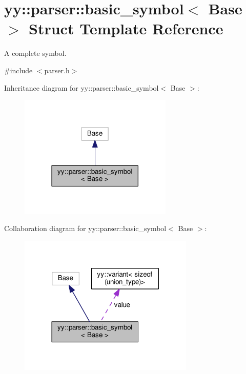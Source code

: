 \hypertarget{structyy_1_1parser_1_1basic__symbol}{}\section{yy\+:\+:parser\+:\+:basic\+\_\+symbol$<$ Base $>$ Struct Template Reference}
\label{structyy_1_1parser_1_1basic__symbol}


A complete symbol.  




{\ttfamily \#include $<$parser.\+h$>$}



Inheritance diagram for yy\+:\+:parser\+:\+:basic\+\_\+symbol$<$ Base $>$\+:
\nopagebreak
\begin{figure}[H]
\begin{center}
\leavevmode
\includegraphics[width=206pt]{structyy_1_1parser_1_1basic__symbol__inherit__graph}
\end{center}
\end{figure}


Collaboration diagram for yy\+:\+:parser\+:\+:basic\+\_\+symbol$<$ Base $>$\+:
\nopagebreak
\begin{figure}[H]
\begin{center}
\leavevmode
\includegraphics[width=236pt]{structyy_1_1parser_1_1basic__symbol__coll__graph}
\end{center}
\end{figure}
